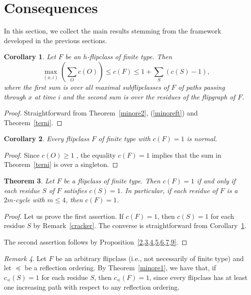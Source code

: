 \documentclass[12pt,reqno]{amsart}
\theoremstyle{plain}
\newtheorem{thm}{Theorem}[section]
\newtheorem{cor}[thm]{Corollary}
\theoremstyle{definition}
\theoremstyle{remark}
\newtheorem{rmk}[thm]{Remark}
\begin{document}
\section{Consequences}
In this section, we collect the main results stemming from the framework developed in the previous sections. 
\begin{cor}
\label{inug}
Let $F$ be an $h$-flipclass of finite type. Then
$$\max_{(x,i)} \left( \sum_{O}  c(O) \right) \leq c(F) \leq 1 + \sum_{S}(c(S)-1),$$
where the first sum is over all maximal subflipclasses of $F$ of paths passing through $x$ at time $i$  and the second sum  is over the residues of the flipgraph of $F$. 
\end{cor}
\begin{proof}
Straightforward from Theorem~\ref{minore2}, (\ref{minoreft}) and Theorem~\ref{terni}.
\end{proof}

\begin{cor}
Every flipclass $F$ of finite type with $c(F)=1$ is  normal.
\end{cor}
\begin{proof}
Since $c(O) \geq 1$%
, the equality $c(F) = 1$ implies that the sum in Theorem~\ref{terni} is over a singleton.
\end{proof}

\begin{thm}
\label{c=1}
Let $F$ be a flipclass of finite type. Then  $c(F)=1$ if and only if each residue $S$ of $F$ satisfies $c(S)=1$. In particular, if each residue of $F$ is a $2m$-cycle with $m\leq 4$, then $c(F)=1$.
\end{thm}
\begin{proof}
Let us prove the first assertion. If $c(F)=1$, then $c(S)=1$ for each residue  $S$ by Remark~\ref{cracker}. The converse is straightforward from Corollary~\ref{inug}. 

The second assertion follows by Proposition~\ref{2,3,4,5,6,7,9}.
\end{proof}
\begin{rmk}
Let $F$ be an arbitrary flipclass (i.e., not necessarily of finite type) and let $\preceq$ be a reflection ordering. By Theorem~\ref{minore1}, we have that, if $c_{\preceq} (S)=1$ for each residue $S$, then $c_{\preceq}(F)=1$, since every flipclass has at least one increasing path with respect to any reflection ordering. 
\end{rmk}
\end{document}
